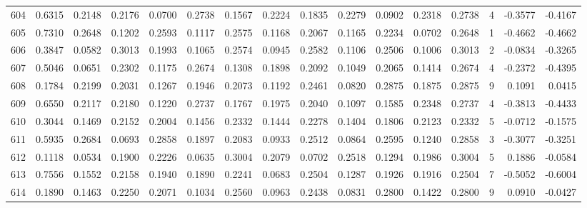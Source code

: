 \begin{tabular}{lrrrrrrrrrrrrrrr}
604 &      0.6315 &  0.2148 &  0.2176 &  0.0700 &  0.2738 &  0.1567 &  0.2224 &  0.1835 &  0.2279 &  0.0902 &   0.2318 &     0.2738 &      4 &                   -0.3577 &                    -0.4167 \\
605 &      0.7310 &  0.2648 &  0.1202 &  0.2593 &  0.1117 &  0.2575 &  0.1168 &  0.2067 &  0.1165 &  0.2234 &   0.0702 &     0.2648 &      1 &                   -0.4662 &                    -0.4662 \\
606 &      0.3847 &  0.0582 &  0.3013 &  0.1993 &  0.1065 &  0.2574 &  0.0945 &  0.2582 &  0.1106 &  0.2506 &   0.1006 &     0.3013 &      2 &                   -0.0834 &                    -0.3265 \\
607 &      0.5046 &  0.0651 &  0.2302 &  0.1175 &  0.2674 &  0.1308 &  0.1898 &  0.2092 &  0.1049 &  0.2065 &   0.1414 &     0.2674 &      4 &                   -0.2372 &                    -0.4395 \\
608 &      0.1784 &  0.2199 &  0.2031 &  0.1267 &  0.1946 &  0.2073 &  0.1192 &  0.2461 &  0.0820 &  0.2875 &   0.1875 &     0.2875 &      9 &                    0.1091 &                     0.0415 \\
609 &      0.6550 &  0.2117 &  0.2180 &  0.1220 &  0.2737 &  0.1767 &  0.1975 &  0.2040 &  0.1097 &  0.1585 &   0.2348 &     0.2737 &      4 &                   -0.3813 &                    -0.4433 \\
610 &      0.3044 &  0.1469 &  0.2152 &  0.2004 &  0.1456 &  0.2332 &  0.1444 &  0.2278 &  0.1404 &  0.1806 &   0.2123 &     0.2332 &      5 &                   -0.0712 &                    -0.1575 \\
611 &      0.5935 &  0.2684 &  0.0693 &  0.2858 &  0.1897 &  0.2083 &  0.0933 &  0.2512 &  0.0864 &  0.2595 &   0.1240 &     0.2858 &      3 &                   -0.3077 &                    -0.3251 \\
612 &      0.1118 &  0.0534 &  0.1900 &  0.2226 &  0.0635 &  0.3004 &  0.2079 &  0.0702 &  0.2518 &  0.1294 &   0.1986 &     0.3004 &      5 &                    0.1886 &                    -0.0584 \\
613 &      0.7556 &  0.1552 &  0.2158 &  0.1940 &  0.1890 &  0.2241 &  0.0683 &  0.2504 &  0.1287 &  0.1926 &   0.1916 &     0.2504 &      7 &                   -0.5052 &                    -0.6004 \\
614 &      0.1890 &  0.1463 &  0.2250 &  0.2071 &  0.1034 &  0.2560 &  0.0963 &  0.2438 &  0.0831 &  0.2800 &   0.1422 &     0.2800 &      9 &                    0.0910 &                    -0.0427 \\

\end{tabular}
